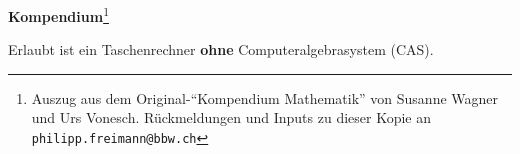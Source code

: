 
\textbf{Kompendium}\footnote{Auszug aus dem Original-``Kompendium
  Mathematik'' \cite{kompendium18} von Susanne Wagner und Urs Vonesch. Rückmeldungen und Inputs zu dieser Kopie an \texttt{philipp.freimann@bbw.ch}}

Erlaubt ist ein Taschenrechner \textbf{ohne} Computeralgebrasystem
(CAS).
